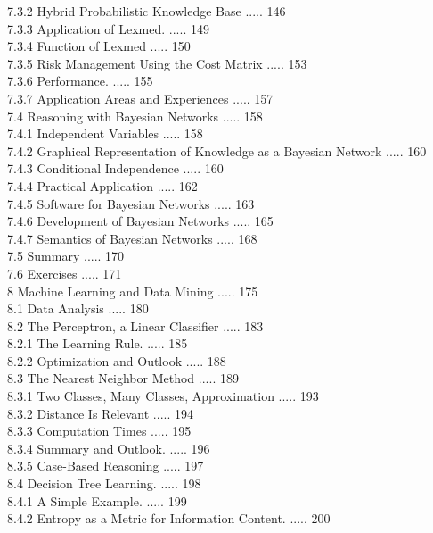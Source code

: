\documentclass[10pt]{book}
\begin{document}
7.3.2 Hybrid Probabilistic Knowledge Base ..... 146\\
7.3.3 Application of Lexmed. ..... 149\\
7.3.4 Function of Lexmed ..... 150\\
7.3.5 Risk Management Using the Cost Matrix ..... 153\\
7.3.6 Performance. ..... 155\\
7.3.7 Application Areas and Experiences ..... 157\\
7.4 Reasoning with Bayesian Networks ..... 158\\
7.4.1 Independent Variables ..... 158\\
7.4.2 Graphical Representation of Knowledge as a Bayesian Network ..... 160\\
7.4.3 Conditional Independence ..... 160\\
7.4.4 Practical Application ..... 162\\
7.4.5 Software for Bayesian Networks ..... 163\\
7.4.6 Development of Bayesian Networks ..... 165\\
7.4.7 Semantics of Bayesian Networks ..... 168\\
7.5 Summary ..... 170\\
7.6 Exercises ..... 171\\
8 Machine Learning and Data Mining ..... 175\\
8.1 Data Analysis ..... 180\\
8.2 The Perceptron, a Linear Classifier ..... 183\\
8.2.1 The Learning Rule. ..... 185\\
8.2.2 Optimization and Outlook ..... 188\\
8.3 The Nearest Neighbor Method ..... 189\\
8.3.1 Two Classes, Many Classes, Approximation ..... 193\\
8.3.2 Distance Is Relevant ..... 194\\
8.3.3 Computation Times ..... 195\\
8.3.4 Summary and Outlook. ..... 196\\
8.3.5 Case-Based Reasoning ..... 197\\
8.4 Decision Tree Learning. ..... 198\\
8.4.1 A Simple Example. ..... 199\\
8.4.2 Entropy as a Metric for Information Content. ..... 200\\
\end{document}

